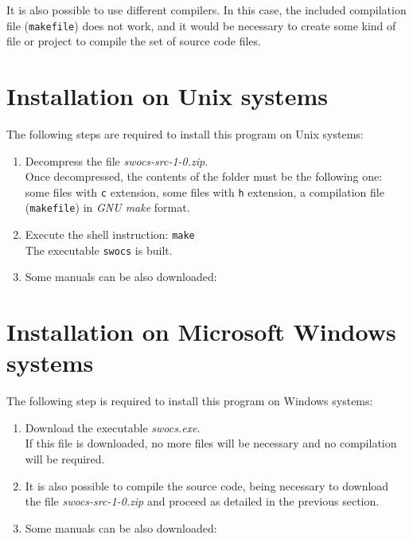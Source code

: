 \documentclass[a4paper,12pt]{report}
\begin{document}
It is also possible to use different compilers. In this case, the included
compilation file ({\tt makefile}) does not work, and it would be necessary
to create some kind of file or project to compile the set of source code files.  
\section{Installation on Unix systems}

The following steps are required to install this program on Unix systems:
\begin{enumerate}
	\item Decompress the file \emph{swocs-src-1-0.zip}. \\
		Once decompressed, the contents of the folder must be the following one:
		some files with {\tt c} extension, some files with {\tt h} extension, a
		compilation file ({\tt makefile}) in \emph{GNU make} format.
	\item Execute the shell instruction: {\tt make} \\
			The executable {\tt swocs} is built. 
	\item Some manuals can be also downloaded:
\end{enumerate}

\section{Installation on Microsoft Windows systems}

The following step is required to install this program on Windows systems:
\begin{enumerate}
	\item Download the executable \emph{swocs.exe}. \\
		If this file is downloaded, no more files will be necessary and no
		compilation will be required.
	\item It is also possible to compile the source code, being necessary to
		download the file \emph{swocs-src-1-0.zip} and proceed as detailed in
		the previous section.
	\item Some manuals can be also downloaded:
\end{enumerate}
\end{document}
